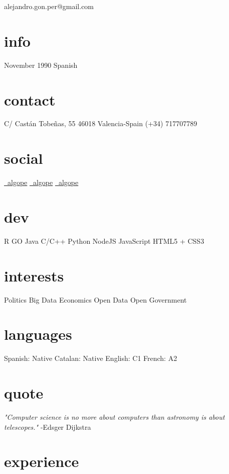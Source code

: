\documentclass[]{cv}
\begin{document}
       {alejandro.gon.per@gmail.com}


\begin{aside}
	\section{info}
	November 1990
	Spanish
    \section{contact}
        C/ Castán Tobeñas, 55
        46018 Valencia-Spain
        (+34) 717707789
    \section{social}
        \href{https://www.linkedin.com/in/algope}{\faLinkedin\ algope} 
        \href{http://github.com/algope}{\faGithub\ algope}
        \href{http://twitter.com/algope_}{\faTwitter\ algope}
    \section{dev}
        R
        GO
        Java
        C/C++
        Python
        NodeJS
        JavaScript
        HTML5 + CSS3
    \section{interests}
        Politics
        Big Data
        Economics
        Open Data
        Open Government
     \section{languages}
     	Spanish: Native
     	Catalan: Native
     	English: C1
     	French: A2
\end{aside}

\section{quote}
\emph{"Computer science is no more about computers than astronomy is about telescopes."} -Edsger Dijkstra

\section{experience}
\end{document}
